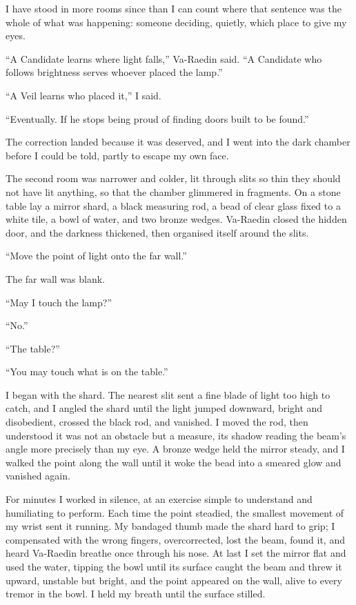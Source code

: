 I have stood in more rooms since than I can count where that sentence was the whole of what was happening: someone deciding, quietly, which place to give my eyes.\par

``A Candidate learns where light falls,'' Va-Raedin said. 
``A Candidate who follows brightness serves whoever placed the lamp.''\par
``A Veil learns who placed it,'' I said.\par
``Eventually. If he stops being proud of finding doors built to be found.''\par

The correction landed because it was deserved, and I went into the dark chamber before I could be told, partly to escape my own face.\par

\ornament

The second room was narrower and colder, lit through slits so thin they should not have lit anything, so that the chamber glimmered in fragments. 
On a stone table lay a mirror shard, a black measuring rod, a bead of clear glass fixed to a white tile, a bowl of water, and two bronze wedges. 
Va-Raedin closed the hidden door, and the darkness thickened, then organised itself around the slits.\par

``Move the point of light onto the far wall.''\par
The far wall was blank.\par
``May I touch the lamp?''\par
``No.''\par
``The table?''\par

``You may touch what is on the table.''\par

I began with the shard. 
The nearest slit sent a fine blade of light too high to catch, and I angled the shard until the light jumped downward, bright and disobedient, crossed the black rod, and vanished. 
I moved the rod, then understood it was not an obstacle but a measure, its shadow reading the beam's angle more precisely than my eye. 
A bronze wedge held the mirror steady, and I walked the point along the wall until it woke the bead into a smeared glow and vanished again.\par

For minutes I worked in silence, at an exercise simple to understand and humiliating to perform. 
Each time the point steadied, the smallest movement of my wrist sent it running. 
My bandaged thumb made the shard hard to grip; I compensated with the wrong fingers, overcorrected, lost the beam, found it, and heard Va-Raedin breathe once through his nose. 
At last I set the mirror flat and used the water, tipping the bowl until its surface caught the beam and threw it upward, unstable but bright, 
and the point appeared on the wall, alive to every tremor in the bowl. I held my breath until the surface stilled.\par

